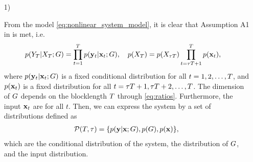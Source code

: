 \documentclass[12pt, draftclsnofoot,journal,onecolumn]{IEEEtran}
\begin{document}
\begin{itemize}
    \item [1)]

From the model \eqref{eq:nonlinear_system_model}, it is clear that Assumption A1 in \cite{gaopart1} is met, i.e.
\begin{align*}
 &p(Y_{T}|X_{T};G)=\prod_{t=1}^{T}p({\mathbf{y}}_t|{\mathbf{x}}_t;G),\quad p(X_T)=p(X_{{\tau T}})\prod_{t={\tau T}+1}^{T}p({\mathbf{x}}_t),
\end{align*}
where $p({\mathbf{y}}_t|{\mathbf{x}}_t;G)$ is a fixed conditional distribution for all $t=1,2,\ldots,T$, and $p({\mathbf{x}}_t)$ is a fixed distribution for all $t={\tau T}+1,{\tau T}+2,\ldots,T$. 
The dimension of $G$ depends on the blocklength $T$ through \eqref{eq:ratios}. 
Furthermore, the input ${\mathbf{x}}_t$ are \iid for all $t$. Then, we can express the system by a set of distributions defined as
\begin{align}
    \mathcal{P}(T,\tau)=\{p({\mathbf{y}}|{\mathbf{x}};G),p(G),p({\mathbf{x}})\},
    \label{eq:P_set_iid_A_input}
\end{align}
which are the conditional distribution of the system, the distribution of $G$, and the input distribution. 


\end{itemize}
\end{document}
